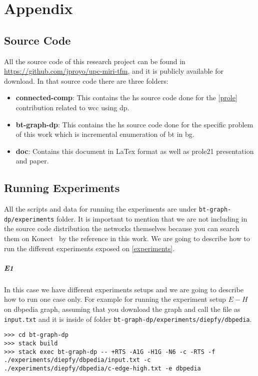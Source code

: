 \chapter{Appendix}
\section{Source Code}
All the source code of this research project can be found in \url{https://github.com/jproyo/upc-miri-tfm}, and it is publicly available for download.
In that source code there are three folders:

\begin{itemize}
  \item \textbf{connected-comp}: This contains the \acrshort{hs} source code done for the \autoref{prole} contribution related to \acrfull{wcc} using \acrshort{dp}.
  \item \textbf{bt-graph-dp}: This contains the \acrshort{hs} source code done for the specific problem of this work which is incremental enumeration of \acrlong{bt} in \acrlong{bg}.
  \item \textbf{doc}: Contains this document in LaTex format as well as \acrshort{prole21} presentation and paper.
\end{itemize}

\section{Running Experiments}\label{apx:running:experiments}
All the scripts and data for running the experiments are under \texttt{bt-graph-dp/experiments} folder.
It is important to mention that we are not including in the source code distribution the networks themselves because you can search them on Konect~\cite{konect} by the reference in this work.
We are going to describe how to run the different experiments exposed on \autoref{experiments}. 

\paragraph{E1} In this case we have different experiments setups and we are going to describe how to run one case only.
For example for running the experiment setup $E-H$ on \acrshort{dbpedia} graph, assuming that you download the graph and call the file as 
\texttt{input.txt} and it is inside of folder \texttt{bt-graph-dp/experiments/diepfy/dbpedia}.
\begin{verbatim}
>>> cd bt-graph-dp
>>> stack build
>>> stack exec bt-graph-dp -- +RTS -A1G -H1G -N6 -c -RTS -f ./experiments/diepfy/dbpedia/input.txt -c ./experiments/diepfy/dbpedia/c-edge-high.txt -e dbpedia
\end{verbatim}


